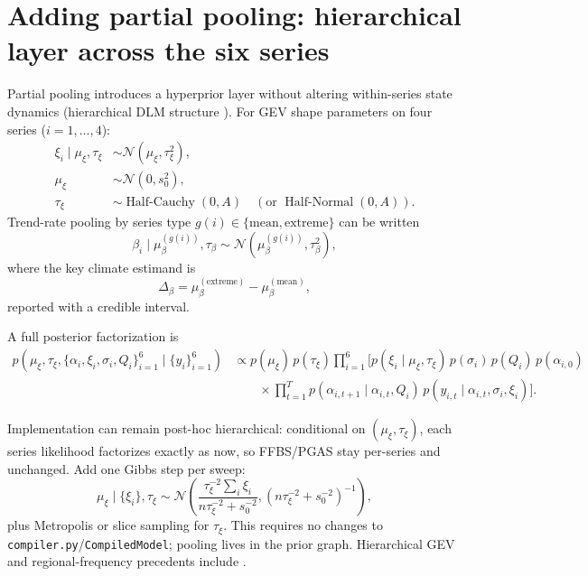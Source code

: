 \documentclass[11pt]{article}
\begin{document}
\section{Adding partial pooling: hierarchical layer across the six series}
Partial pooling introduces a hyperprior layer without altering within-series state dynamics (hierarchical DLM structure \cite{gamerman1993,gelman2007}). For GEV shape parameters on four series ($i=1,\ldots,4$):
\begin{align}
\xi_i \mid \mu_\xi,\tau_\xi &\sim \mathcal{N}(\mu_\xi,\tau_\xi^2), \\
\mu_\xi &\sim \mathcal{N}(0,s_0^2), \\
\tau_\xi &\sim \operatorname{Half\text{-}Cauchy}(0,A) \quad (\text{or } \operatorname{Half\text{-}Normal}(0,A)).
\end{align}
Trend-rate pooling by series type $g(i)\in\{\text{mean},\text{extreme}\}$ can be written
\begin{equation}
\beta_i \mid \mu_\beta^{(g(i))},\tau_\beta \sim \mathcal{N}(\mu_\beta^{(g(i))},\tau_\beta^2),
\end{equation}
where the key climate estimand is
\begin{equation}
\Delta_\beta = \mu_\beta^{(\mathrm{extreme})} - \mu_\beta^{(\mathrm{mean})},
\end{equation}
reported with a credible interval.

A full posterior factorization is
\begin{align}
p\!\left(\mu_\xi,\tau_\xi,\{\alpha_i,\xi_i,\sigma_i,Q_i\}_{i=1}^{6}\mid\{y_i\}_{i=1}^{6}\right)
&\propto p(\mu_\xi)\,p(\tau_\xi)
\prod_{i=1}^{6}\Bigg[p(\xi_i\mid\mu_\xi,\tau_\xi)\,p(\sigma_i)\,p(Q_i)\,p(\alpha_{i,0}) \\
&\qquad\times \prod_{t=1}^{T} p(\alpha_{i,t+1}\mid\alpha_{i,t},Q_i)\,p(y_{i,t}\mid\alpha_{i,t},\sigma_i,\xi_i)\Bigg].
\end{align}

Implementation can remain post-hoc hierarchical: conditional on $(\mu_\xi,\tau_\xi)$, each series likelihood factorizes exactly as now, so FFBS/PGAS stay per-series and unchanged. Add one Gibbs step per sweep:
\begin{equation}
\mu_\xi\mid\{\xi_i\},\tau_\xi \sim \mathcal{N}\!\left(
\frac{\tau_\xi^{-2}\sum_i \xi_i}{n\tau_\xi^{-2}+s_0^{-2}},
\left(n\tau_\xi^{-2}+s_0^{-2}\right)^{-1}
\right),
\end{equation}
plus Metropolis or slice sampling for $\tau_\xi$. This requires no changes to \texttt{compiler.py}/\texttt{CompiledModel}; pooling lives in the prior graph. Hierarchical GEV and regional-frequency precedents include \cite{coles1996,cooley2007,renard2011,sang2009,martins2000}.
\end{document}
